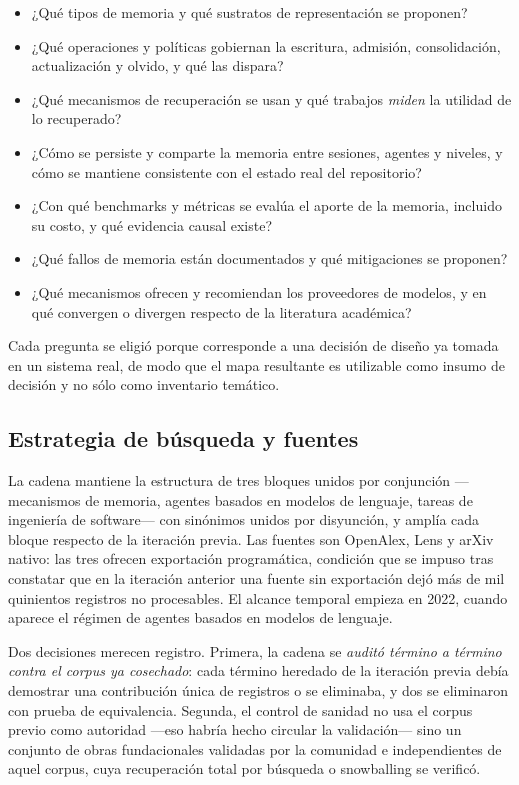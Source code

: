 \documentclass[conference]{IEEEtran}
\begin{document}
\begin{itemize}\itemsep2pt
\item[\textbf{RQ1}] ¿Qué tipos de memoria y qué sustratos de representación se proponen?
\item[\textbf{RQ2}] ¿Qué operaciones y políticas gobiernan la escritura, admisión, consolidación,
      actualización y olvido, y qué las dispara?
\item[\textbf{RQ3}] ¿Qué mecanismos de recuperación se usan y qué trabajos \emph{miden} la utilidad
      de lo recuperado?
\item[\textbf{RQ4}] ¿Cómo se persiste y comparte la memoria entre sesiones, agentes y niveles, y cómo
      se mantiene consistente con el estado real del repositorio?
\item[\textbf{RQ5}] ¿Con qué benchmarks y métricas se evalúa el aporte de la memoria, incluido su
      costo, y qué evidencia causal existe?
\item[\textbf{RQ6}] ¿Qué fallos de memoria están documentados y qué mitigaciones se proponen?
\item[\textbf{RQ7}] ¿Qué mecanismos ofrecen y recomiendan los proveedores de modelos, y en qué
      convergen o divergen respecto de la literatura académica?
\end{itemize}

Cada pregunta se eligió porque corresponde a una decisión de diseño ya tomada en un sistema real, de
modo que el mapa resultante es utilizable como insumo de decisión y no sólo como inventario
temático.

\subsection{Estrategia de búsqueda y fuentes}
\label{sec:search}

La cadena mantiene la estructura de tres bloques unidos por conjunción —mecanismos de memoria,
agentes basados en modelos de lenguaje, tareas de ingeniería de software— con sinónimos unidos por
disyunción, y amplía cada bloque respecto de la iteración previa. Las fuentes son OpenAlex, Lens y
arXiv nativo: las tres ofrecen exportación programática, condición que se impuso tras constatar que
en la iteración anterior una fuente sin exportación dejó más de mil quinientos registros no
procesables. El alcance temporal empieza en 2022, cuando aparece el régimen de agentes basados en
modelos de lenguaje.

Dos decisiones merecen registro. Primera, la cadena se \emph{auditó término a término contra el
corpus ya cosechado}: cada término heredado de la iteración previa debía demostrar una contribución
única de registros o se eliminaba, y dos se eliminaron con prueba de equivalencia. Segunda, el
control de sanidad no usa el corpus previo como autoridad —eso habría hecho circular la validación—
sino un conjunto de obras fundacionales validadas por la comunidad e independientes de aquel corpus,
cuya recuperación total por búsqueda o snowballing se verificó.
\end{document}
